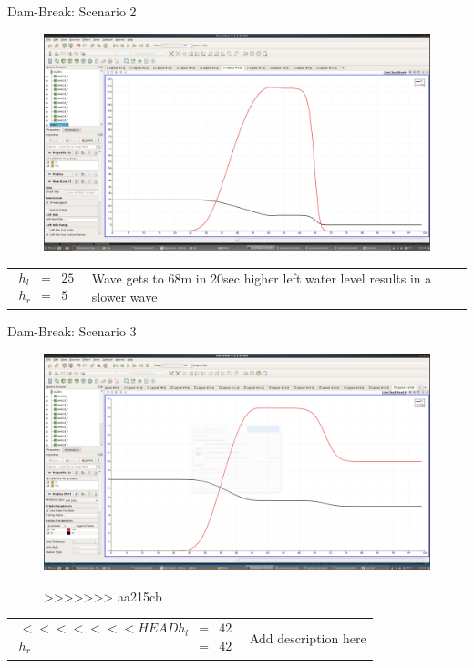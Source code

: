 \documentclass[shortpres]{beamer}
\newcommand{\imgvoffset}{-20pt}
\newcommand{\imgfullscale}{0.75}
\begin{document}
\begin{frame}{Dam-Break: Scenario 2}
	\begin{figure}[t]
		\vspace{\imgvoffset}
		\includegraphics[width=\imgfullscale\linewidth]{img/Dam_hl25_hr5.png}
		\caption*{ }
	\end{figure}
	
	\begin{tabular}{m{3cm} m{\linewidth-5cm}}
		$
		\begin{matrix}
		h_l & = & 25\\
		h_r & = & 5
		\end{matrix}
		$
		&
		
		Wave gets to 68m in 20sec
		\newline \rightarrow higher left water level results in a slower wave
	\end{tabular}
\end{frame}


\begin{frame}{Dam-Break: Scenario 3}
	\begin{figure}[t]
		\vspace{\imgvoffset}
		\includegraphics[width=\imgfullscale\linewidth]{img/Dam_river.png}
		\caption*{}
>>>>>>> aa215cb
	\end{figure}
	
	\begin{tabular}{m{3cm} m{\linewidth-5cm}}
		$
		\begin{matrix}
<<<<<<< HEAD
		h_l & = & 42\\
		h_r & = & 42
		\end{matrix}
		$
		&
		Add description here
	\end{tabular}
\end{frame}
\end{document}
